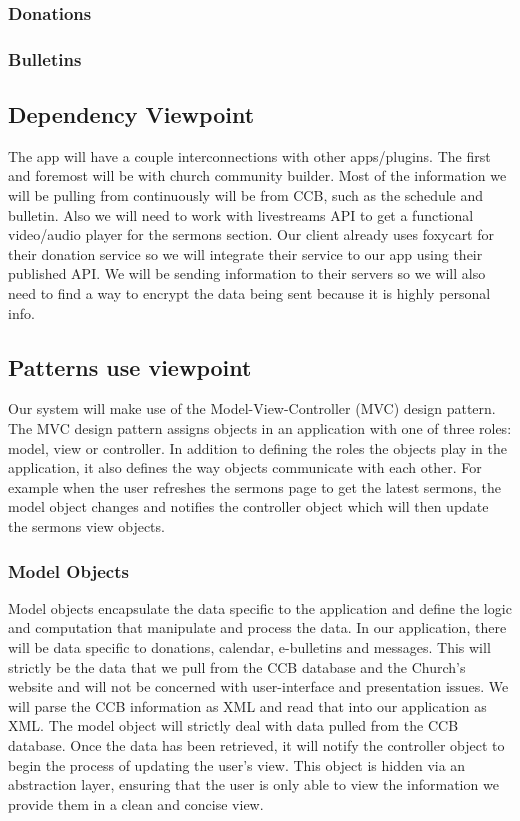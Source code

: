 \documentclass[letterpaper,10pt,draftclsnofoot,onecolumn,titlepage]{IEEEtran}
\begin{document}
			\subsubsection{Donations}
			
			\subsubsection{Bulletins}
			
			
		\subsection{Dependency Viewpoint}
			The app will have a couple interconnections with other apps/plugins.
			The first and foremost will be with church community builder.
			Most of the information we will be pulling from continuously will be from CCB, such as the schedule and bulletin.
			Also we will need to work with livestreams API to get a functional video/audio player for the sermons section.
			Our client already uses foxycart for their donation service so we will integrate their service to our app using their published API.
			We will be sending information to their servers so we will also need to find a way to encrypt the data being sent because it is highly personal info.

		\subsection{Patterns use viewpoint}
			Our system will make use of the Model-View-Controller (MVC) design pattern.
			The MVC design pattern assigns objects in an application with one of three roles: model, view or controller.
			In addition to defining the roles the objects play in the application, it also defines the way objects communicate with each other.
			For example when the user refreshes the sermons page to get the latest sermons, the model object changes and notifies the controller object which will then update the sermons view objects.

			\subsubsection{Model Objects}
				Model objects encapsulate the data specific to the application and define the logic and computation that manipulate and process the data.
				In our application, there will be data specific to donations, calendar, e-bulletins and messages.
				This will strictly be the data that we pull from the CCB database and the Church's website and will not be concerned with user-interface and presentation issues.
				We will parse the CCB information as XML and read that into our application as XML.
				The model object will strictly deal with data pulled from the CCB database.
				Once the data has been retrieved, it will notify the controller object to begin the process of updating the user's view.
				This object is hidden via an abstraction layer, ensuring that the user is only able to view the information we provide them in a clean and concise view.
\end{document}
